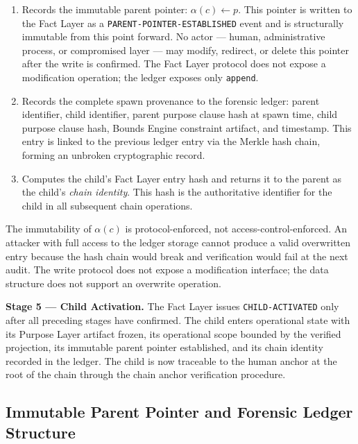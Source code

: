 \begin{enumerate}
  \item[(FL-W1)] Records the immutable parent pointer: $\alpha(c) \gets p$. This pointer is written to the Fact Layer as a \texttt{PARENT-POINTER-ESTABLISHED} event and is structurally immutable from this point forward. No actor — human, administrative process, or compromised layer — may modify, redirect, or delete this pointer after the write is confirmed. The Fact Layer protocol does not expose a modification operation; the ledger exposes only \texttt{append}.
  \item[(FL-W2)] Records the complete spawn provenance to the forensic ledger: parent identifier, child identifier, parent purpose clause hash at spawn time, child purpose clause hash, Bounds Engine constraint artifact, and timestamp. This entry is linked to the previous ledger entry via the Merkle hash chain, forming an unbroken cryptographic record.
  \item[(FL-W3)] Computes the child's Fact Layer entry hash and returns it to the parent as the child's \emph{chain identity}. This hash is the authoritative identifier for the child in all subsequent chain operations.
\end{enumerate}

The immutability of $\alpha(c)$ is protocol-enforced, not access-control-enforced. An attacker with full access to the ledger storage cannot produce a valid overwritten entry because the hash chain would break and verification would fail at the next audit. The write protocol does not expose a modification interface; the data structure does not support an overwrite operation.

\bigskip
\noindent\textbf{Stage 5 — Child Activation.} The Fact Layer issues \texttt{CHILD-ACTIVATED} only after all preceding stages have confirmed. The child enters operational state with its Purpose Layer artifact frozen, its operational scope bounded by the verified projection, its immutable parent pointer established, and its chain identity recorded in the ledger. The child is now traceable to the human anchor at the root of the chain through the chain anchor verification procedure.

\subsection{Immutable Parent Pointer and Forensic Ledger Structure}

